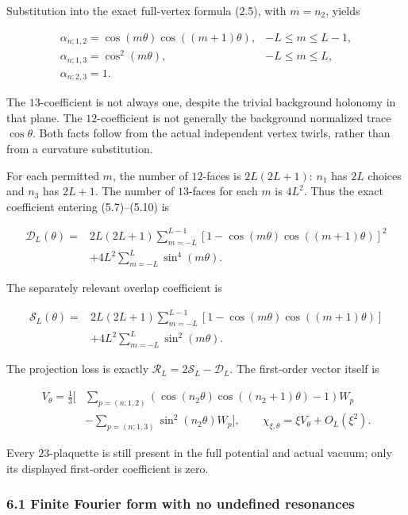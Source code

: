 \documentclass[
  11pt,
]{article}
\begin{document}
Substitution into the exact full-vertex formula (2.5), with \(m=n_2\),
yields

\[
\boxed{
\begin{array}{ll}
\alpha_{n;1,2}=\cos(m\theta)\cos((m+1)\theta),&-L\le m\le L-1,\\
\alpha_{n;1,3}=\cos^2(m\theta),&-L\le m\le L,\\
\alpha_{n;2,3}=1.&
\end{array}}
\tag{6.2}
\]

The \(13\)-coefficient is not always one, despite the trivial background
holonomy in that plane. The \(12\)-coefficient is not generally the
background normalized trace \(\cos\theta\). Both facts follow from the
actual independent vertex twirls, rather than from a curvature
substitution.

For each permitted \(m\), the number of \(12\)-faces is \(2L(2L+1)\):
\(n_1\) has \(2L\) choices and \(n_3\) has \(2L+1\). The number of
\(13\)-faces for each \(m\) is \(4L^2\). Thus the exact coefficient
entering (5.7)--(5.10) is

\[
\boxed{\begin{split}
\mathcal D_L(\theta)
={}&2L(2L+1)\sum_{m=-L}^{L-1}
[1-\cos(m\theta)\cos((m+1)\theta)]^2\\
&+4L^2\sum_{m=-L}^{L}\sin^4(m\theta).
\end{split}}
\tag{6.3}
\]

The separately relevant overlap coefficient is

\[
\begin{split}
\mathcal S_L(\theta)
={}&2L(2L+1)\sum_{m=-L}^{L-1}
[1-\cos(m\theta)\cos((m+1)\theta)]\\
&+4L^2\sum_{m=-L}^{L}\sin^2(m\theta).
\end{split}
\tag{6.4}
\]

The projection loss is exactly
\(\mathcal R_L=2\mathcal S_L-\mathcal D_L\). The first-order vector
itself is

\[
\begin{split}
V_\theta=\frac13\bigg[
&\sum_{p=(n;1,2)}(\cos(n_2\theta)\cos((n_2+1)\theta)-1)W_p\\
&-\sum_{p=(n;1,3)}\sin^2(n_2\theta)W_p
\bigg],\qquad \chi_{\xi,\theta}=\xi V_\theta+O_L(\xi^2).
\end{split}
\tag{6.5}
\]

Every \(23\)-plaquette is still present in the full potential and actual
vacuum; only its displayed first-order coefficient is zero.

\subsubsection{6.1 Finite Fourier form with no undefined
resonances}\label{magnetic-part-2-finite-fourier-form-with-no-undefined-resonances}
\end{document}

